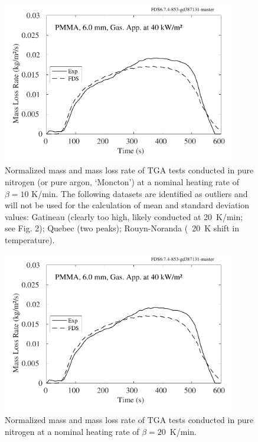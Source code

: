 \documentclass{book}
\begin{document}
\begin{figure}
  \centering
  \includegraphics[width=4in]{SCRIPT_FIGURES/PMMA_40}
  \caption{Normalized mass and mass loss rate of TGA tests conducted in pure nitrogen (or pure argon, ‘Moncton’) at a nominal heating rate of $\beta = 10$ K/min. The following datasets are identified as outliers and will not be used for the calculation of mean and standard deviation values: Gatineau (clearly too high, likely conducted at 20~K/min; see Fig. 2); Quebec (two peaks); Rouyn-Noranda (~20~K shift in temperature).}
  \label{Fig_6}
\end{figure}

\begin{figure}
  \centering
  \includegraphics[width=4in]{SCRIPT_FIGURES/PMMA_40}
  \caption{Normalized mass and mass loss rate of TGA tests conducted in pure nitrogen at a nominal heating rate of $\beta=20$~K/min.}
  \label{Fig_7}
\end{figure}
\end{document}
